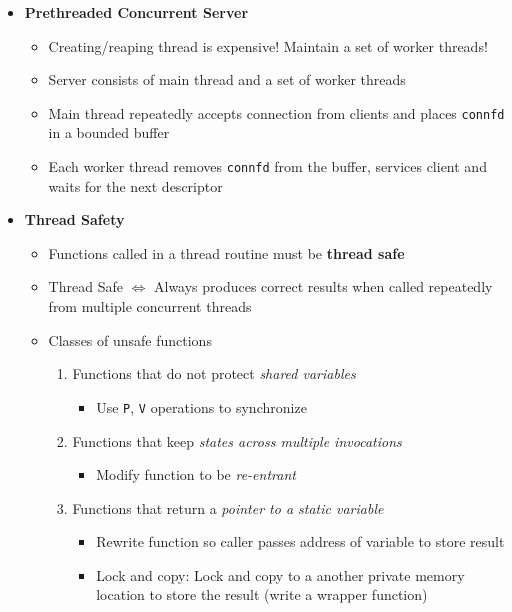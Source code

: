 \documentclass[12pt]{article}
\begin{document}
{\begin{itemize}
\begin{itemize}
\begin{itemize}
			\item Readers that arrive after a writer must wait, even if the writer is also waiting
			\item Starvation for readers may happen
		\end{itemize}
	\end{itemize}
	\item \textbf{Prethreaded Concurrent Server}
	\begin{itemize}
		\item Creating/reaping thread is expensive! Maintain a set of worker threads!
		\item Server consists of main thread and a set of worker threads
		\item Main thread repeatedly accepts connection from clients and places \texttt{connfd} in a bounded buffer
		\item Each worker thread removes \texttt{connfd} from the buffer, services client and waits for the next descriptor
	\end{itemize}
	\item \textbf{Thread Safety}
	\begin{itemize}
		\item Functions called in a thread routine must be \textbf{thread safe}
		\item Thread Safe $\iff$ Always produces correct results when called repeatedly from multiple concurrent threads
		\item Classes of unsafe functions
		\begin{enumerate}
			\item Functions that do not protect \textit{shared variables}
			\begin{itemize}
				\item Use \texttt{P}, \texttt{V} operations to synchronize
			\end{itemize}
			\item Functions that keep \textit{states across multiple invocations}
			\begin{itemize}
				\item Modify function to be \textit{re-entrant}
			\end{itemize}
			\item Functions that return a \textit{pointer to a static variable}
			\begin{itemize}
				\item Rewrite function so caller passes address of variable to store result
				\item Lock and copy: Lock and copy to a another private memory location to store the result (write a wrapper function)

\end{itemize}
\end{enumerate}
\end{itemize}
\end{itemize}}
\end{document}
